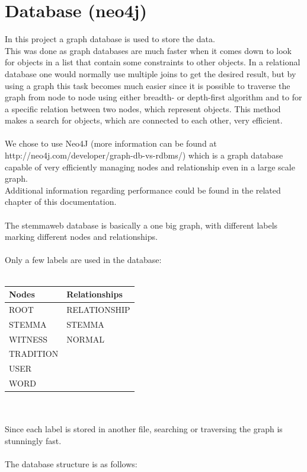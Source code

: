 \documentclass[11pt,fleqn,openany]{book} %
\begin{document}

\chapter{Database (neo4j)}

In this project a graph database is used to store the data.\\ This was done as graph databases are much faster when it comes down to look for objects in a list that contain some constraints to other objects. In a relational database one would normally use multiple joins to get the desired result, but by using a graph this task becomes much easier since it is possible to traverse the graph from node to node using either breadth- or depth-first algorithm and to for a specific relation between two nodes, which represent objects. This method makes a search for objects, which are connected to each other, very efficient. \\ \quad \\We chose to use Neo4J (more information can be found at http://neo4j.com/developer/graph-db-vs-rdbms/) which is a graph database capable of very efficiently managing nodes and relationship even in a large scale graph.\\
Additional information regarding performance could be found in the related chapter of this documentation. \\ \quad \\The stemmaweb database is basically a one big graph, with different labels marking different nodes and relationships. \\ \quad \\Only a few labels are used in the database:\\ \quad \\
\begin{tabular}{|l|l|}
\hline 
\textbf{Nodes} & \textbf{Relationships} \\ 
\hline 
ROOT & RELATIONSHIP \\ 
\hline 
STEMMA & STEMMA \\ 
\hline 
WITNESS & NORMAL \\ 
\hline 
TRADITION &  \\ 
\hline 
USER &  \\ 
\hline 
WORD &  \\ 
\hline 
\end{tabular} \\\\
Since each label is stored in another file, searching or traversing the graph is stunningly fast. \\ \quad \\ The database structure is as follows:
\end{document}

